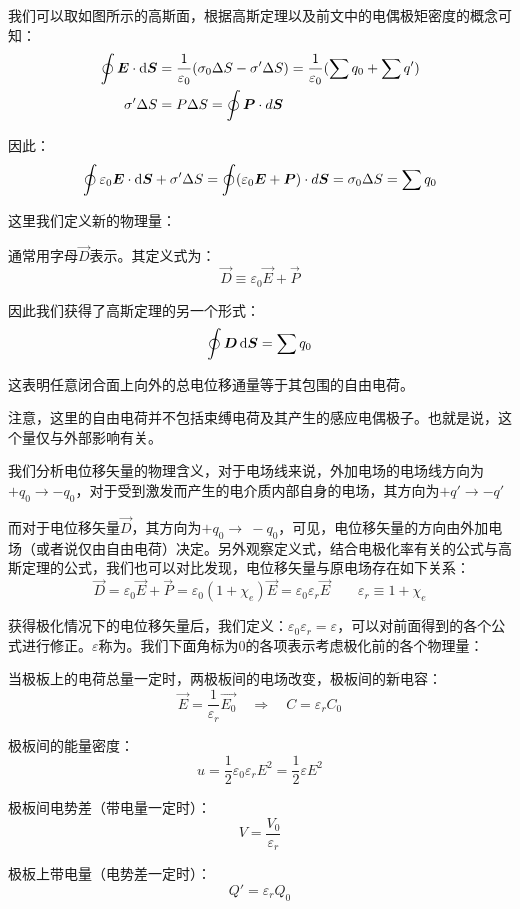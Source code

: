 我们可以取如图所示的高斯面，根据高斯定理以及前文中的电偶极矩密度的概念可知：
\begin{align*}
    \oint \vec{E} \cdot \dif{\vec{S}} &= \dfrac{1}{\varepsilon_0}(\sigma_0\Delta S - \sigma'\Delta S) = \dfrac{1}{\varepsilon_0}(\sum q_0 + \sum q')\\
    \sigma'\Delta S &= P\Delta S = \oint\vec{P} \cdot d\vec{S}
\end{align*}

因此：
\[\oint\varepsilon_0\vec{E} \cdot \dif{\vec{S}} + \sigma'\Delta S = \oint (\varepsilon_0\vec{E} + \vec{P}) \cdot d\vec{S} = \sigma_0\Delta S = \sum q_0\]

这里我们定义新的物理量：
\begin{law}
    通常用字母$\vec{D}$表示。其定义式为：
    \[\vec{D}\equiv\varepsilon_0\vec{E}+\vec{P}\]

    因此我们获得了高斯定理的另一个形式：
    \[\oint\vec{D}\dif{\vec{S}}=\sum q_0\]

    这表明任意闭合面上向外的总电位移通量等于其包围的自由电荷。
\end{law}

注意，这里的自由电荷并不包括束缚电荷及其产生的感应电偶极子。也就是说，这个量仅与外部影响有关。

我们分析电位移矢量的物理含义，对于电场线来说，外加电场的电场线方向为$+q_0\rightarrow -q_0$，对于受到激发而产生的电介质内部自身的电场，其方向为$+q'\rightarrow -q'$

而对于电位移矢量$\vec{D}$，其方向为$+q_0\rightarrow\ -q_0$，可见，电位移矢量的方向由外加电场（或者说仅由自由电荷）决定。另外观察定义式，结合电极化率有关的公式与高斯定理的公式，我们也可以对比发现，电位移矢量与原电场存在如下关系：
\[\vec{D}=\varepsilon_0\vec{E}+\vec{P}=\varepsilon_0(1+\chi_e)\vec{E}=\varepsilon_0\varepsilon_r\vec{E}\qquad\varepsilon_r\equiv1+\chi_e\]

获得极化情况下的电位移矢量后，我们定义：$\varepsilon_0\varepsilon_r = \varepsilon$，可以对前面得到的各个公式进行修正。$\varepsilon$称为。我们下面角标为0的各项表示考虑极化前的各个物理量：
\begin{Itemize}
    \item 当极板上的电荷总量一定时，两极板间的电场改变，极板间的新电容：
    \[\vec{E}=\dfrac{1}{\varepsilon_r}\vec{E_0}\quad\Rightarrow\quad C=\varepsilon_r C_0\]
    \item 极板间的能量密度：
    \[u=\dfrac{1}{2}\varepsilon_0\varepsilon_r E^2=\dfrac{1}{2}\varepsilon E^2\]
    \item 极板间电势差（带电量一定时）：
    \[V = \dfrac{V_0}{\varepsilon_r}\]
    \item 极板上带电量（电势差一定时）：
    \[Q'= \varepsilon_r Q_0\]
\end{Itemize}

